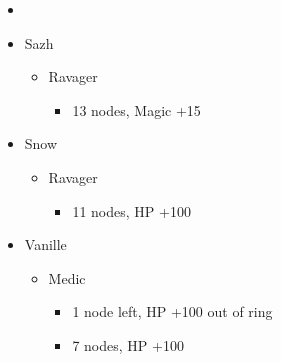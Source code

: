 	\begin{menu}
		\begin{itemize}
			\paradigm
			\begin{itemize}
				\item {}%
				      {}%
				      {\paradigmline{(\rav)}{\rav}{\rav}}%
				      {\paradigmline{\rav}{(\rav)}{(\med)}}%
				      {\paradigmline{\com}{\com}{(\med)}}%
				      {\paradigmline[5]{\textit{\rav}}{\textit{(\rav)}}{\textit{\sab}}}%
				      {\paradigmline{\com}{\com}{\rav}}
			\end{itemize}
			\crystarium
			\begin{itemize}
				\item Sazh
				      \begin{itemize}
					      \item Ravager
					            \begin{itemize}
						            \item 13 nodes, Magic +15
					            \end{itemize}
				      \end{itemize}
				\item Snow
				      \begin{itemize}
					      \item Ravager
					            \begin{itemize}
						            \item 11 nodes, HP +100
					            \end{itemize}
				      \end{itemize}
				\item Vanille
				      \begin{itemize}
					      \item Medic
					            \begin{itemize}
						            \item 1 node left, HP +100 out of ring
						            \item 7 nodes, HP +100
					            \end{itemize}
				      \end{itemize}
			\end{itemize}
		\end{itemize}
	\end{menu}


